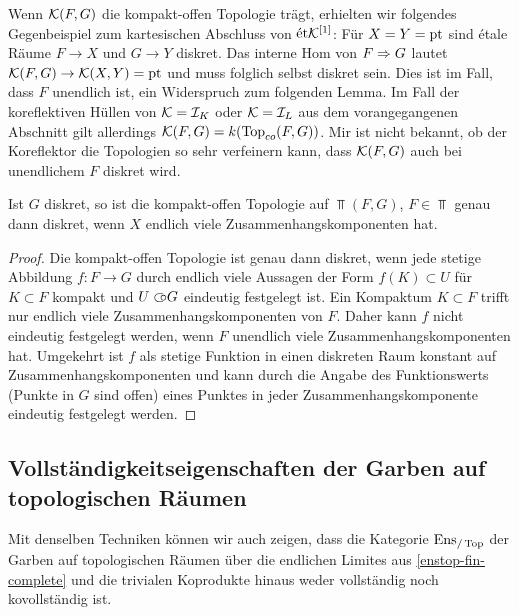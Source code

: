 \begin{bem}
  Wenn $\mathcal{K}(F, G)$ die kompakt-offen Topologie trägt, erhielten wir
  folgendes Gegenbeispiel zum kartesischen Abschluss von $\mathrm{\acute{e}t}
  \mathcal{K}^{[1]}$: Für $X = Y = \operatorname{pt}$ sind étale Räume $F \to X$ und $G
  \to Y$ diskret. Das interne Hom von $F \Rightarrow G$ lautet $\mathcal{K}(F, G) \to
  \mathcal{K}(X, Y) = \operatorname{pt}$ und muss folglich selbst diskret sein. Dies ist
  im Fall, dass $F$ unendlich ist, ein Widerspruch zum folgenden
  Lemma. Im Fall der koreflektiven Hüllen von $\mathcal{K} = \mathcal{I}_K$
  oder $\mathcal{K} = \mathcal{I}_L$ aus dem vorangegangenen Abschnitt gilt
  allerdings $\mathcal{K}(F, G) = k(\operatorname{Top}_{co}(F, G))$. Mir ist nicht bekannt,
  ob der Koreflektor die Topologien so sehr verfeinern kann, dass
  $\mathcal{K}(F, G)$ auch bei unendlichem $F$ diskret wird.
\end{bem}
\begin{lemma} \label{compact-open-discrete}
  Ist $G$ diskret, so ist die kompakt-offen Topologie auf $\Top(F,
  G)$, $F \in \Top$ genau dann diskret, wenn $X$ endlich viele
  Zusammenhangskomponenten hat.
\end{lemma}
\begin{proof}
  Die kompakt-offen Topologie ist genau dann diskret, wenn jede
  stetige Abbildung $f: F \to G$ durch endlich viele Aussagen der Form
  $f(K) \subset U$ für $K \subset F$ kompakt und $U \subset\kern-0.58em\circ G$ eindeutig
  festgelegt ist. Ein Kompaktum $K \subset F$ trifft nur endlich viele
  Zusammenhangskomponenten von $F$. Daher kann $f$ nicht eindeutig
  festgelegt werden, wenn $F$ unendlich viele Zusammenhangskomponenten
  hat. Umgekehrt ist $f$ als stetige Funktion in einen diskreten Raum
  konstant auf Zusammenhangskomponenten und kann durch die Angabe des
  Funktionswerts (Punkte in $G$ sind offen) eines Punktes in jeder
  Zusammenhangskomponente eindeutig festgelegt werden.
\end{proof}

\subsection{Vollständigkeitseigenschaften der Garben auf topologischen Räumen}

Mit denselben Techniken können wir auch zeigen, dass die Kategorie
$\operatorname{Ens}_{/\operatorname{Top}}$ der Garben auf topologischen Räumen über die endlichen
Limites aus \ref{enstop-fin-complete} und die trivialen Koprodukte
hinaus weder vollständig noch kovollständig ist.

